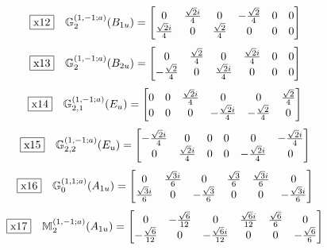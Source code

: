 \documentclass[fleqn,10pt,landscape]{jsarticle}
\begin{document}
\begin{dmath*}
\fbox{x12}\quad \mathbb{G}_{2}^{(1,-1;a)}(B_{1u})=\begin{bmatrix} 0 & \frac{\sqrt{2} i}{4} & 0 & - \frac{\sqrt{2}}{4} & 0 & 0 \\ \frac{\sqrt{2} i}{4} & 0 & \frac{\sqrt{2}}{4} & 0 & 0 & 0 \end{bmatrix}
\end{dmath*}
\begin{dmath*}
\fbox{x13}\quad \mathbb{G}_{2}^{(1,-1;a)}(B_{2u})=\begin{bmatrix} 0 & \frac{\sqrt{2}}{4} & 0 & \frac{\sqrt{2} i}{4} & 0 & 0 \\ - \frac{\sqrt{2}}{4} & 0 & \frac{\sqrt{2} i}{4} & 0 & 0 & 0 \end{bmatrix}
\end{dmath*}
\begin{dmath*}
\fbox{x14}\quad \mathbb{G}_{2,1}^{(1,-1;a)}(E_{u})=\begin{bmatrix} 0 & 0 & \frac{\sqrt{2} i}{4} & 0 & 0 & \frac{\sqrt{2}}{4} \\ 0 & 0 & 0 & - \frac{\sqrt{2} i}{4} & - \frac{\sqrt{2}}{4} & 0 \end{bmatrix}
\end{dmath*}
\begin{dmath*}
\fbox{x15}\quad \mathbb{G}_{2,2}^{(1,-1;a)}(E_{u})=\begin{bmatrix} - \frac{\sqrt{2} i}{4} & 0 & 0 & 0 & 0 & - \frac{\sqrt{2} i}{4} \\ 0 & \frac{\sqrt{2} i}{4} & 0 & 0 & - \frac{\sqrt{2} i}{4} & 0 \end{bmatrix}
\end{dmath*}
\begin{dmath*}
\fbox{x16}\quad \mathbb{G}_{0}^{(1,1;a)}(A_{1u})=\begin{bmatrix} 0 & \frac{\sqrt{3} i}{6} & 0 & \frac{\sqrt{3}}{6} & \frac{\sqrt{3} i}{6} & 0 \\ \frac{\sqrt{3} i}{6} & 0 & - \frac{\sqrt{3}}{6} & 0 & 0 & - \frac{\sqrt{3} i}{6} \end{bmatrix}
\end{dmath*}
\begin{dmath*}
\fbox{x17}\quad \mathbb{M}_{2}^{(1,-1;a)}(A_{1u})=\begin{bmatrix} 0 & - \frac{\sqrt{6}}{12} & 0 & \frac{\sqrt{6} i}{12} & \frac{\sqrt{6}}{6} & 0 \\ - \frac{\sqrt{6}}{12} & 0 & - \frac{\sqrt{6} i}{12} & 0 & 0 & - \frac{\sqrt{6}}{6} \end{bmatrix}
\end{dmath*}
\end{document}
